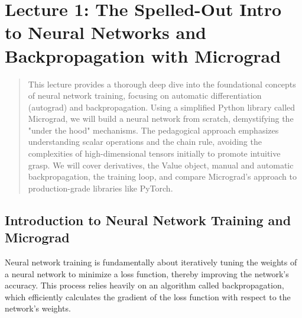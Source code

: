 
\section{Lecture 1: The Spelled-Out Intro to Neural Networks and Backpropagation with Micrograd}

\begin{abstract}
This lecture provides a thorough deep dive into the foundational concepts of neural network training, focusing on automatic differentiation (autograd) and backpropagation. Using a simplified Python library called Micrograd, we will build a neural network from scratch, demystifying the "under the hood" mechanisms. The pedagogical approach emphasizes understanding scalar operations and the chain rule, avoiding the complexities of high-dimensional tensors initially to promote intuitive grasp. We will cover derivatives, the Value object, manual and automatic backpropagation, the training loop, and compare Micrograd's approach to production-grade libraries like PyTorch.
\end{abstract}

\subsection{Introduction to Neural Network Training and Micrograd}
Neural network training is fundamentally about iteratively tuning the weights of a neural network to minimize a loss function, thereby improving the network's accuracy. This process relies heavily on an algorithm called backpropagation, which efficiently calculates the gradient of the loss function with respect to the network's weights.

